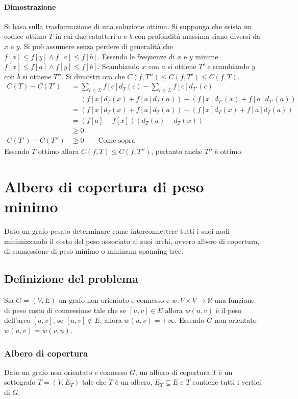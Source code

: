 \paragraph{Dimostrazione}
Si basa sulla trasformazione di una soluzione ottima. Si supponga che esista un codice ottimo $T$ in cui due catatteri $a$ e $b$ con profondit\`a massima siano diversi da $x$ e $y$. 
Si pu\`o assumere senza perdere di generalit\`a che $f[x]\le f[y]\land f[a]\le f[b]$. Essendo le frequenze di $x$ e $y$ minime $f[x]\le f[a]\land f[y]\le f[b]$. Scambiando $x$ con $a$
si ottiene $T'$ e scambiando $y$ con $b$ si ottiene $T''$. Si dimostri ora che $C(f, T'')\le C(f, T')\le C(f, T)$.
\begin{align*}
	C(T) - C(T') & = \sum\limits_{c\in \Sigma}f[c]d_T(c) - \sum\limits_{c\in\Sigma}f[c]d_{T'}(c)\\
	             & = (f[x]d_T(x)+f[a]d_T(a)) - (f[x]d_{T'}(x) + f[a]d_{T'}(a))\\
		     & = (f[x]d_T(x)+f[a]d_T(a)) - (f[x]d_{T}(x) + f[a]d_{T}(a))\\
		     & = (f[a] - f[x])(d_T(a) - d_T(x))\\
		     & \ge 0\\
	C(T') - C(T'') & \ge 0\quad\quad \text{Come sopra}
\end{align*}
Essendo $T$ ottimo allora $C(f, T)\le C(f, T'')$, pertanto anche $T''$ \`e ottimo.
\section{Albero di copertura di peso minimo}
Dato un grafo pesato determinare come interconnettere tutti i suoi nodi minimizzando il costo del peso associato ai suoi archi, ovvero albero di copertura, di connessione di peso minimo
o minimum spanning tree.
\subsection{Definizione del problema}
Sia $G=(V, E)$ un grafo non orientato e connesso e $w:V\times V\rightarrow\mathbb{R}$ una funzione di peso costo di connessione tale che se $[u, v]\in E$ allora $w(u, v)$ \`e il peso 
dell'arco $[u, v]$, se $[u, v]\not\in E$, allora $w(u, v)= + \infty$. Essendo $G$ non orientato $w(u, v) = w(v, u)$.
\subsubsection{Albero di copertura}
Dato un grafo non orientato e connesso $G$, un albero di copertura $T$ \`e un sottografo $T=(V, E_T)$ tale che $T$ \`e un albero, $E_T\subseteq E$ e $T$ contiene tutti i vertici di $G$. 

